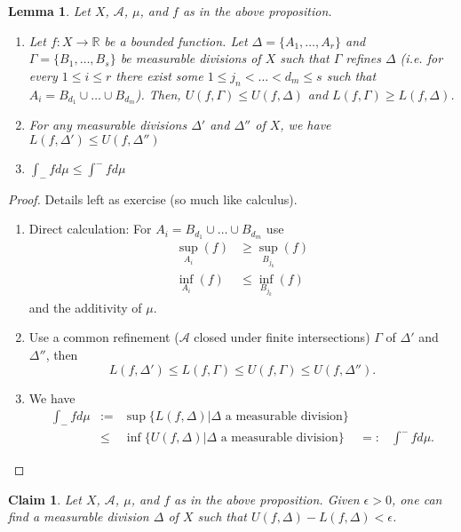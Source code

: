 \documentclass[letterpaper, 12pt]{article}
\newcommand{\bR}{\mathbb{R}}
\newcommand{\sA}{\mathcal{A}}
\theoremstyle{stdthm}
\newtheorem{lem}[thm]{Lemma}
\theoremstyle{stddef}
\theoremstyle{stdnonum}
\newtheorem{claim}{Claim}
\theoremstyle{stdqands}
\theoremstyle{stdbold}
\begin{document}
\begin{lem}
Let $X$, $\sA$, $\mu$, and $f$ as in the above proposition.
\begin{enumerate}
\item  Let $f:X \rightarrow \bR$ be a bounded function. Let $\Delta = \{A_1,\dots, A_r\}$ and $\Gamma = \{B_1,\dots,B_s\}$ be measurable divisions of $X$ such that $\Gamma$ refines $\Delta$ (i.e. for every $1\leq i \leq r$ there exist some $1\leq j_n < \dots < d_m \leq s$ such that $A_i = B_{d_1} \cup \dots \cup B_{d_{m}}$). Then, $U(f,\Gamma) \leq U(f,\Delta)$ and $L(f,\Gamma) \geq L(f,\Delta)$. 
\item For any measurable divisions $\Delta '$ and $\Delta ''$ of $X$, we have $L(f,\Delta') \leq U(f,\Delta'')$
\item $\int_{-}fd\mu \leq \int^{-} fd\mu $
\end{enumerate}
\end{lem}

\begin{proof}
Details left as exercise (so much like calculus). %
\begin{enumerate}
\item Direct calculation: For $A_i = B_{d_1} \cup \dots \cup B_{d_m}$ use 
\begin{align*}
\sup_{A_i}(f) &\geq \sup_{B_{j_k}}(f)\\
\inf_{A_i}(f) &\leq \inf_{B_{j_k}}(f)
\end{align*}
and the additivity of $\mu$. 
\item Use a common refinement ($\sA$ closed under finite intersections) $\Gamma$ of $\Delta'$ and $\Delta ''$, then 
\[L(f,\Delta') \leq L(f,\Gamma) \leq U(f,\Gamma) \leq U(f,\Delta ''). \]
\item We have
\[\begin{array}{ccccc}
\int_{-}fd\mu &:=& \sup\{L(f,\Delta)|\Delta \text{ a measurable division}\}& \\
 &\leq& \inf\{ U(f,\Delta)|\Delta \text{ a measurable division}\} &=:& \int^{-}fd\mu.
\end{array}
\]
\end{enumerate}
\end{proof}

\begin{claim}
Let $X$, $\sA$, $\mu$, and $f$ as in the above proposition.
Given $\epsilon >0 $, one can find a measurable division $\Delta$ of $X$ such that $U(f,\Delta) - L(f,\Delta) < \epsilon$. 
\end{claim}
\end{document}
